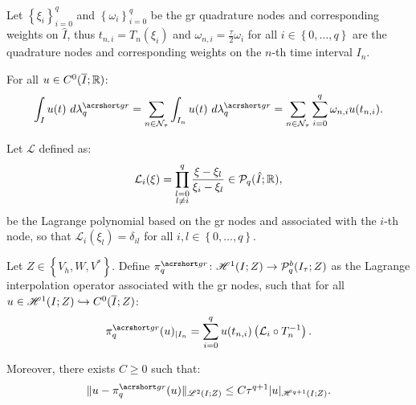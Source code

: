Let $\left\{ \xi_i \right\}_{i = 0}^{q}$ and $\left\{ \omega_i \right\}_{i = 0}^{q}$ be the \acrlong{gr} quadrature nodes and corresponding weights on $\hat{I}$, thus $t_{n, i} = T_n(\xi_i)$ and $\omega_{n, i} = \frac{\tau}{2} \omega_i$ for all $i \in \left\{ 0, \dots, q \right\}$ are the quadrature nodes and corresponding weights on the $n$-th time interval $I_n$.

\begin{definition}[$\lambdaGR_q$]
    For all $u \in C^0(\overline{I}; \mathbb{R})$:
    \begin{gather}
        \int_I u(t) ~ d \lambdaGR_q = \sum_{n \in \TimeIndices} \int_{I_n} u(t) ~ d \lambdaGR_q = \sum_{n \in \TimeIndices} \sum_{i = 0}^q \omega_{n, i} u(t_{n, i}).
    \end{gather}
\end{definition}

\begin{definition}
    Let $\mathcal{L}$ defined as:
    \begin{gather}
        \mathcal{L}_i (\xi) = \prod_{\substack{l = 0 \\ l \neq i}}^q \frac{\xi - \xi_l}{\xi_i - \xi_l} \in \mathcal{P}_{q}(\hat{I}; \mathbb{R}),
    \end{gather}
    be the Lagrange polynomial based on the \acrshort{gr} nodes and associated with the $i$-th node, so that $\mathcal{L}_i (\xi_l) = \delta_{i l}$ for all $i, l \in \left\{ 0, \dots, q\right\}$.
\end{definition}

\begin{definition}[$\InterpolantGR_q$]
    Let $Z \in \left\{V_h, W, V^* \right\}$. Define $\InterpolantGR_q \colon \SpaceHk{1}(I; Z) \rightarrow \SpacePolynomials{q}^b(\TimeMesh; Z)$ as the Lagrange interpolation operator associated with the \acrshort{gr} nodes, such that for all $u \in \mathscr{H}^{1}(I; Z) \hookrightarrow C^0(\overline{I}; Z)$:
    \begin{gather}
        \InterpolantGR_q(u)_{\mid I_n} = \sum_{i = 0}^q u(t_{n, i}) \left( \mathcal{L}_i \circ T_n^{-1} \right).
    \end{gather}

    Moreover, there exists $C \geq 0$ such that:
    \begin{gather}
        \lVert u - \InterpolantGR_q(u) \rVert_{\SpaceLp{2}(I; Z)} \leq C \tau^{q + 1} \lvert u \rvert_{\SpaceHk{q + 1}(I; Z)}.
    \end{gather}
\end{definition}

